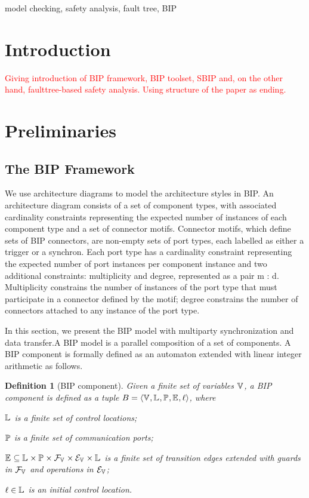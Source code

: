 \documentclass[conference]{IEEEtran}
\newtheorem{definition}{Definition}
\begin{document}
\begin{IEEEkeywords}
model checking, safety analysis, fault tree, BIP
\end{IEEEkeywords}

\section{Introduction}
\textcolor{red}{
Giving introduction of BIP framework, BIP toolset, SBIP and, on the other hand, faulttree-based safety analysis. Using structure of the paper as ending.
}

\section{Preliminaries}

\subsection{The BIP Framework}
We use architecture diagrams \cite{} to model the architecture styles in BIP.
An architecture diagram consists of a set of component types, with associated cardinality constraints representing the
expected number of instances of each component type and a set of connector motifs.
Connector motifs, which define sets of BIP connectors, are non-empty sets of port types, each labelled as either a trigger or a synchron.
Each port type has a cardinality constraint representing the expected number of port instances
per component instance and two additional constraints: multiplicity and degree,
represented as a pair m : d. Multiplicity constrains the number of instances of
the port type that must participate in a connector defined by the motif; degree
constrains the number of connectors attached to any instance of the port type.

In this section, we present the BIP model with multiparty synchronization and data transfer.A BIP model is a parallel composition of a set of components.
A BIP component is formally defined as an automaton extended with linear integer arithmetic as follows.

\begin{definition} [BIP component]
	\label{component-def}
	Given a finite set of variables $\mathbb{V}_{}$, a BIP component is defined as a tuple
	$B_{} = \langle{\ensuremath{\mathbb{V}_{}}, \ensuremath{\mathbb{L}_{}}, \ensuremath{\mathbb{P}_{}}, \ensuremath{\mathbb{E}_{}}, \ell}\rangle$, where
	\begin{inparaenum}
		\item $\mathbb{L}_{}$ is a finite set of control locations;
		\item $\mathbb{P}_{}$ is a finite set of communication ports;
		\item $\mathbb{E}_{} \subseteq \mathbb{L}_{} \times \mathbb{P}_{} \times \mathcal{F}_{\mathbb{V}_{}} \times \mathcal{E}_{\mathbb{V}_{}} \times \mathbb{L}_{}$
		is a finite set of transition edges extended with guards in $\mathcal{F}_{\mathbb{V}_{}}$
		and operations in $\mathcal{E}_{\mathbb{V}_{}}$;
		\item $\ell \in \mathbb{L}_{}$ is an initial control location.
	\end{inparaenum}
\end{definition}
\end{document}

